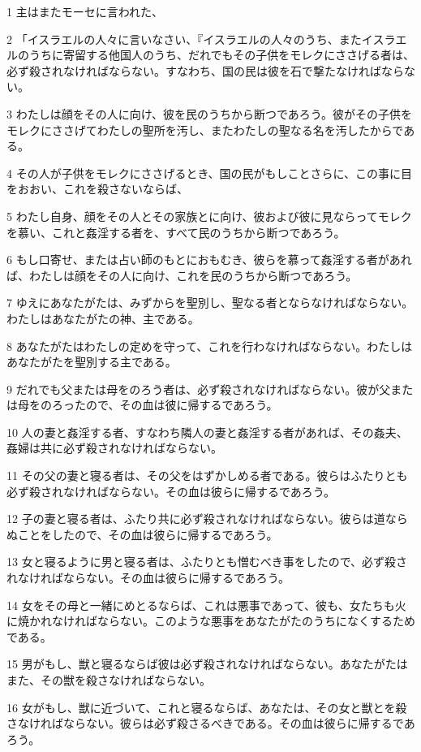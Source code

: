 \par 1 主はまたモーセに言われた、
\par 2 「イスラエルの人々に言いなさい、『イスラエルの人々のうち、またイスラエルのうちに寄留する他国人のうち、だれでもその子供をモレクにささげる者は、必ず殺されなければならない。すなわち、国の民は彼を石で撃たなければならない。
\par 3 わたしは顔をその人に向け、彼を民のうちから断つであろう。彼がその子供をモレクにささげてわたしの聖所を汚し、またわたしの聖なる名を汚したからである。
\par 4 その人が子供をモレクにささげるとき、国の民がもしことさらに、この事に目をおおい、これを殺さないならば、
\par 5 わたし自身、顔をその人とその家族とに向け、彼および彼に見ならってモレクを慕い、これと姦淫する者を、すべて民のうちから断つであろう。
\par 6 もし口寄せ、または占い師のもとにおもむき、彼らを慕って姦淫する者があれば、わたしは顔をその人に向け、これを民のうちから断つであろう。
\par 7 ゆえにあなたがたは、みずからを聖別し、聖なる者とならなければならない。わたしはあなたがたの神、主である。
\par 8 あなたがたはわたしの定めを守って、これを行わなければならない。わたしはあなたがたを聖別する主である。
\par 9 だれでも父または母をのろう者は、必ず殺されなければならない。彼が父または母をのろったので、その血は彼に帰するであろう。
\par 10 人の妻と姦淫する者、すなわち隣人の妻と姦淫する者があれば、その姦夫、姦婦は共に必ず殺されなければならない。
\par 11 その父の妻と寝る者は、その父をはずかしめる者である。彼らはふたりとも必ず殺されなければならない。その血は彼らに帰するであろう。
\par 12 子の妻と寝る者は、ふたり共に必ず殺されなければならない。彼らは道ならぬことをしたので、その血は彼らに帰するであろう。
\par 13 女と寝るように男と寝る者は、ふたりとも憎むべき事をしたので、必ず殺されなければならない。その血は彼らに帰するであろう。
\par 14 女をその母と一緒にめとるならば、これは悪事であって、彼も、女たちも火に焼かれなければならない。このような悪事をあなたがたのうちになくするためである。
\par 15 男がもし、獣と寝るならば彼は必ず殺されなければならない。あなたがたはまた、その獣を殺さなければならない。
\par 16 女がもし、獣に近づいて、これと寝るならば、あなたは、その女と獣とを殺さなければならない。彼らは必ず殺さるべきである。その血は彼らに帰するであろう。
